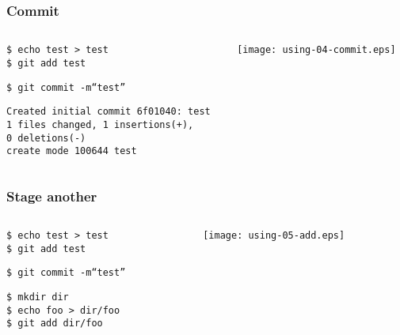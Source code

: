 \documentclass[english]{beamer}
\newcommand{\CMD}[1]{%
\texttt{\textcolor{code-green}{#1}}%
}
\newcommand{\cmd}[1]{%
\texttt{\textcolor{code-orange}{#1}}%
}
\newcommand{\fnt}[1]{%
\texttt{\textcolor{code-gray}{#1}}%
}
\begin{document}
\begin{frame}
\frametitle{Commit}
\begin{columns}[t]
        \begin{column}[T]{.5\textwidth}
                \cmd{\$ echo test > test} \\
                \CMD{\$ git add test}

                \vspace{.1\textheight}

                \CMD{\$ git commit -m``test''} \\
                {\tiny
                \fnt{Created initial commit 6f01040: test \\
                       1 files changed, 1 insertions(+), \\ 0 deletions(-) \\
                       create mode 100644 test}
                }
        \end{column}
        \begin{column}[T]{.5\textwidth}
                \texttt{[image: using-04-commit.eps]}
        \end{column}
\end{columns}
\end{frame}

\begin{frame}
\frametitle{Stage another}
\begin{columns}[t]
        \begin{column}[T]{.5\textwidth}
                \cmd{\$ echo test > test} \\
                \CMD{\$ git add test}

                \vspace{.1\textheight}

                \CMD{\$ git commit -m``test''} \\

                \vspace{.1\textheight}

                \cmd{\$ mkdir dir} \\
                \cmd{\$ echo foo > dir/foo} \\
                \CMD{\$ git add dir/foo}
        \end{column}
        \begin{column}[T]{.5\textwidth}

                \texttt{[image: using-05-add.eps]}

        \end{column}
\end{columns}
\end{frame}
\end{document}
